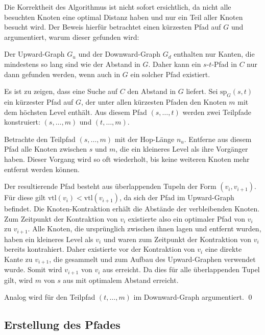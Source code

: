 Die Korrektheit des Algorithmus ist nicht sofort ersichtlich, da nicht alle besuchten Knoten eine optimal Distanz haben und nur ein Teil aller Knoten besucht wird.
Der Beweis hierfür betrachtet einen kürzesten Pfad auf $G$ und argumentiert, warum dieser gefunden wird:


\begin{beweis}\label{ch:proof:correct}
  Der Upward-Graph $G_u$ und der Downward-Graph $G_d$ enthalten nur Kanten, die mindestens so lang sind wie der Abstand in $G$.
  Daher kann ein $s$-$t$-Pfad in $C$ nur dann gefunden werden, wenn auch in $G$ ein solcher Pfad existiert.

  Es ist zu zeigen, dass eine Suche auf $C$ den Abstand in $G$ liefert.
  Sei $\text{sp}_G(s, t)$ ein kürzester Pfad auf $G$, der unter allen kürzesten Pfaden den Knoten $m$ mit dem höchsten Level enthält.
  Aus diesem Pfad $(s, \dotsc, t)$ werden zwei Teilpfade konstruiert: $(s, \dotsc, m)$ und $(t, \dotsc, m)$.

  Betrachte den Teilpfad $(s, \dotsc, m)$ mit der Hop-Länge $n_u$.
  Entferne aus diesem Pfad alle Knoten zwischen $s$ und $m$, die ein kleineres Level als ihre Vorgänger haben.
  Dieser Vorgang wird so oft wiederholt, bis keine weiteren Knoten mehr entfernt werden können.

  Der resultierende Pfad besteht aus überlappenden Tupeln der Form $(v_{i}, v_{i + 1})$.
  Für diese gilt $\text{vtl}(v_i) < \text{vtl}(v_{i + 1})$, da sich der Pfad im Upward-Graph befindet.
  Die Knoten-Kontraktion erhält die Abstände der verbleibenden Knoten.
  Zum Zeitpunkt der Kontraktion von $v_i$ existierte also ein optimaler Pfad von $v_i$ zu $v_{i + 1}$.
  Alle Knoten, die ursprünglich zwischen ihnen lagen und entfernt wurden, haben ein kleineres Level als $v_i$ und waren zum Zeitpunkt der Kontraktion von $v_i$ bereits kontrahiert.
  Daher existierte vor der Kontraktion von $v_i$ eine direkte Kante zu $v_{i + 1}$, die gesammelt und zum Aufbau des Upward-Graphen verwendet wurde.
  Somit wird $v_{i + 1}$ von $v_i$ aus erreicht.
  Da dies für alle überlappenden Tupel gilt, wird $m$ von $s$ aus mit optimalem Abstand erreicht.

  Analog wird für den Teilpfad $(t, \dotsc, m)$ im Downward-Graph argumentiert.
  \qed
\end{beweis}

\subsection{Erstellung des Pfades}\label{ch:subsection:pfad_gewinnung}

